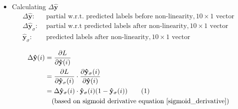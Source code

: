 \documentclass[12pt]{article}
\renewcommand{\vec}[1]{\mathbf{#1}}
\newcommand\numberthis{\stepcounter{equation}\tag{\theequation}}
\begin{document}
\begin{itemize}
\item Calculating $\Delta{\vec{\hat{y}}}$
\begin{align*}
    \Delta{\vec{\hat{y}}}:& \text{ partial w.r.t. predicted labels before non-linearity}, 10 \times 1 \text{ vector}\\
    \Delta{\vec{\hat{y}}_\sigma}:& \text{ partial w.r.t predicted labels after non-linearity}, 10 \times 1 \text{ vector}\\
    {\vec{\hat{y}}_\sigma}:& \text{ predicted labels after non-linearity}, 10 \times 1 \text{ vector}\\
\end{align*}
\begin{align*}
    \Delta{\vec{\hat{y}}}(i)
    &= \frac{\partial{L}}{\partial{\vec{\hat{y}}}(i)}
    \\
    &= \frac{\partial{L}}{\partial{\vec{\hat{y}}_\sigma}(i)}
    \cdot
    \frac{\partial{\vec{\hat{y}}_\sigma}(i)}{\partial{\vec{\hat{y}}}(i)}
    \\
    &= \Delta{\vec{\hat{y}}_\sigma}(i)
    \cdot
    \vec{\hat{y}_\sigma}(i)(1 - \vec{\hat{y}_\sigma}(i))
    \numberthis \label{delta_y_hat}
    \\
    &\quad(\text{based on sigmoid derivative equation } \eqref{sigmoid_derivative})
\end{align*}


\end{itemize}
\end{document}
